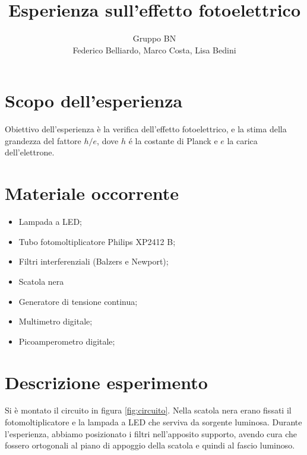 \documentclass[10pt,a4paper]{article}
\author{Gruppo BN \\ Federico Belliardo, Marco Costa, Lisa Bedini}
\title{Esperienza sull'effetto fotoelettrico}
\begin{document}
\maketitle
\section{Scopo dell'esperienza}
Obiettivo dell'esperienza è la verifica dell'effetto fotoelettrico, e la stima della grandezza del fattore $h/e$, dove $h$ \'e la costante di Planck e $e$ la carica dell'elettrone.\\
\section{Materiale occorrente}
\begin{itemize}
\item Lampada a LED;
\item Tubo fotomoltiplicatore Philips XP2412 B;
\item Filtri interferenziali (Balzers e Newport);
\item Scatola nera
\item Generatore di tensione continua;
\item Multimetro digitale;
\item Picoamperometro digitale;
\end{itemize}
\section{Descrizione esperimento}

Si è montato il circuito in figura \ref{fig:circuito}. Nella scatola nera erano fissati il fotomoltiplicatore e la lampada a LED che serviva da sorgente luminosa. Durante l'esperienza, abbiamo posizionato i filtri nell'apposito supporto, avendo cura che fossero ortogonali al piano di appoggio della scatola e quindi al fascio luminoso.
\end{document}
